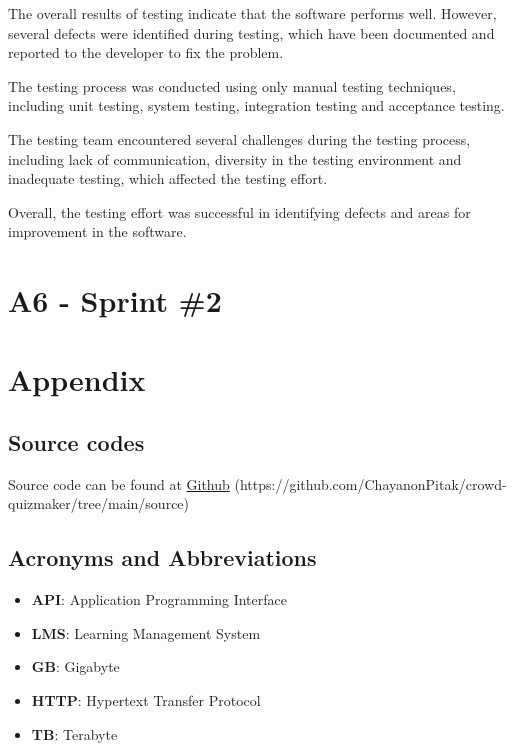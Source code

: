 \documentclass[ 10pt]{report}
\begin{document}
    The overall results of testing indicate that the software performs well. However, several defects were identified during testing, which have been documented and reported to the developer to fix the problem.
    
    The testing process was conducted using only manual testing techniques, including unit testing, system testing, integration testing and acceptance testing.
    
    The testing team encountered several challenges during the testing process, including lack of communication, diversity in the testing environment and inadequate testing, which affected the testing effort.
    
    Overall, the testing effort was successful in identifying defects and areas for improvement in the software.

    \chapter{A6 - Sprint \#2}
    \pagebreak
    
    

    \chapter{Appendix}
        \section{Source codes}
        Source code can be found at \href{https://github.com/ChayanonPitak/crowd-quizmaker/tree/main/source}{Github} (https://github.com/ChayanonPitak/crowd-quizmaker/tree/main/source)
        \section{Acronyms and Abbreviations}
        \begin{itemize}
            \item \textbf{API}: Application Programming Interface
            \item \textbf{LMS}: Learning Management System
            \item \textbf{GB}: Gigabyte
            \item \textbf{HTTP}: Hypertext Transfer Protocol
            \item \textbf{TB}: Terabyte
        \end{itemize}
\end{document}
